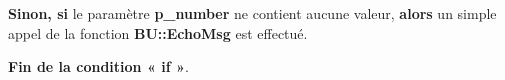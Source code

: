 \documentclass[a4paper,10pt]{article}
\begin{document}
\begin{justify}
    \textbf{\color{cond}Sinon, si} le paramètre \textbf{\color{vars}p\_number} ne contient aucune valeur, \textbf{\color{cond}alors} un simple appel de la fonction \textbf{\color{func}BU::EchoMsg} est effectué.
\end{justify}

\begin{justify}
    \textbf{\color{cond}Fin de la condition « if »}.
\end{justify}
\end{document}

